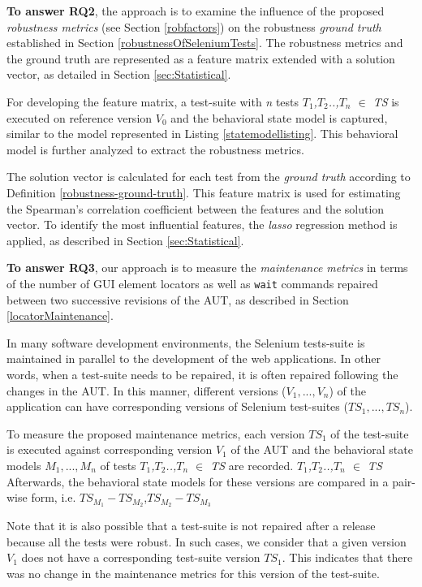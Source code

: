 \textbf{To answer RQ2}, the approach is to examine the influence of the proposed \textit{robustness metrics } (see Section \ref{robfactors}) on the robustness \textit{ground truth} established in Section \ref{robustnessOfSeleniumTests}. The robustness metrics and the ground truth are represented as a feature matrix extended with a solution vector, as detailed in Section \ref{sec:Statistical}. 

For developing the feature matrix, a test-suite with \textit{n} tests \textit{$T_1$,$T_2$..,$T_n$ $\in$ TS} is executed on reference version \textit{$V_{0}$} and the behavioral state model is captured, similar to the model represented in Listing \ref{statemodellisting}. This behavioral model is further analyzed to extract the robustness metrics. 

The solution vector is calculated for each test from the \textit{ground truth} according to Definition \ref{robustness-ground-truth}. This feature matrix is used for estimating the Spearman's correlation coefficient between the features and the solution vector. To identify the most influential features, the \textit{lasso} regression method is applied, as described in Section \ref{sec:Statistical}. 

\textbf{To answer RQ3}, our approach is to measure the \textit{maintenance metrics} in terms of the number of GUI element locators as well as \texttt{wait} commands repaired between two successive revisions of the AUT, as described in Section \ref{locatorMaintenance}.

In many software development environments, the Selenium tests-suite is maintained in parallel to the development of the web applications. In other words, when a test-suite needs to be repaired, it is often repaired following the changes in the AUT. In this manner, different versions (\textit{$V_1,...,V_n$}) of the application can have corresponding versions of Selenium test-suites (\textit{$TS_1,...,TS_n$}). 

To measure the proposed maintenance metrics, each version $TS_1$ of the test-suite is executed against corresponding version $V_1$ of the AUT and the behavioral state models \textit{${M_1},...,{M_n}$} of tests \textit{$T_1$,$T_2$..,$T_n$ $\in$ TS} are recorded.  \textit{$T_1$,$T_2$..,$T_n$ $\in$ TS} Afterwards, the behavioral state models for these versions are compared in a pair-wise form, i.e. \textit{$TS_{M_1} - TS_{M_2}$},\textit{$TS_{M_2} - TS_{M_3}$}

Note that it is also possible that a test-suite is not repaired after a release because all the tests were robust. In such cases, we consider that a given version $V_1$ does not have a corresponding test-suite version $TS_1$. This indicates that there was no change in the maintenance metrics for this version of the test-suite. 
